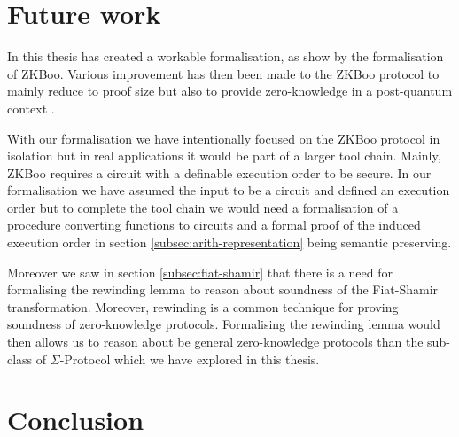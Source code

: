
\section{Future work}
\label{sec:future_work}
In this thesis has created a workable formalisation, as show by the formalisation of
ZKBoo. Various improvement has then been made to the ZKBoo protocol to mainly
reduce to proof size but also to provide zero-knowledge in a post-quantum
context \cite{zkb++}.

With our formalisation we have intentionally focused on the ZKBoo protocol in
isolation but in real applications it would be part of a larger tool chain.
Mainly, ZKBoo requires a circuit with a definable execution order to be secure.
In our formalisation we have assumed the input to be a circuit and defined an
execution order but to complete the tool chain we would need a formalisation of
a procedure converting functions to circuits and a formal proof of the induced
execution order in section \ref{subsec:arith-representation} being semantic preserving.

Moreover we saw in section \ref{subsec:fiat-shamir} that there is a need for
formalising the rewinding lemma to reason about soundness of the Fiat-Shamir
transformation. Moreover, rewinding is a common technique for proving soundness
of zero-knowledge protocols. Formalising the rewinding lemma would then allows
us to reason about be general zero-knowledge protocols than the sub-class of
$\Sigma$-Protocol which we have explored in this thesis.


\section{Conclusion}
\label{sec:conclusion}


